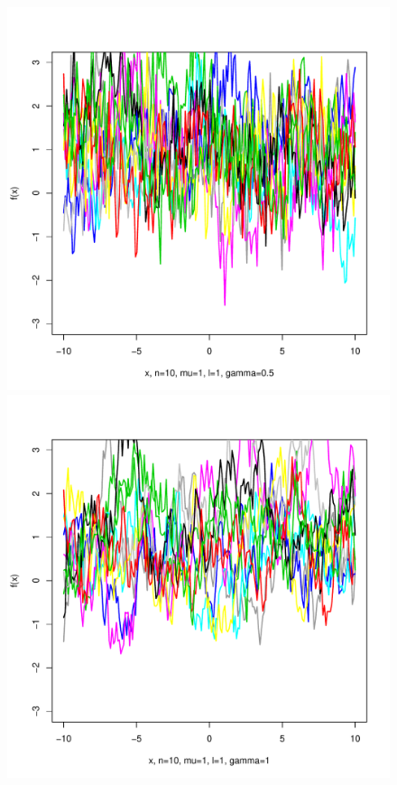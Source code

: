 \documentclass[12pt,letterpaper]{article}
\begin{document}
\begin{figure}
\begin{center}
\includegraphics[scale=0.2]{hw321/n10-m1-l1-g1.pdf}
\includegraphics[scale=0.2]{hw321/n10-m1-l1-g2.pdf}

\end{center}
\end{figure}
\end{document}
